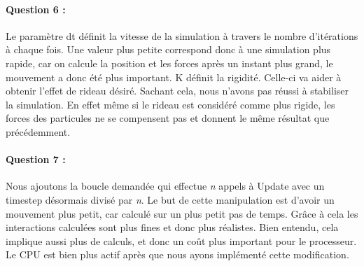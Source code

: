\documentclass[a4paper,12pt]{article}
\begin{document}
\newpage\paragraph{Question 6 :} Le paramètre \og{}dt\fg{} définit la vitesse de la simulation à travers le nombre d'itérations à chaque fois. Une valeur plus petite correspond donc à une simulation plus rapide, car on calcule la position et les forces après un instant plus grand, le mouvement a donc été plus important.
K définit la rigidité. Celle-ci va aider à obtenir l'effet de rideau désiré. Sachant cela, nous n'avons pas réussi à stabiliser la simulation. En effet même si le rideau est considéré comme plus rigide, les forces des particules ne se compensent pas et donnent le même résultat que précédemment.

\paragraph{Question 7 :} Nous ajoutons la boucle demandée qui effectue \textit{n} appels à \og{}Update\fg{} avec un timestep désormais divisé par \textit{n}. Le but de cette manipulation est d'avoir un mouvement plus petit, car calculé sur un plus petit pas de temps. Grâce à cela les interactions calculées sont plus fines et donc plus réalistes. Bien entendu, cela implique aussi plus de calculs, et donc un coût plus important pour le processeur. Le CPU est bien plus actif après que nous ayons implémenté cette modification. 
\end{document}

